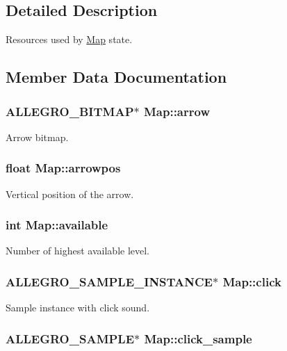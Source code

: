 \subsection{\-Detailed \-Description}
\-Resources used by \hyperlink{structMap}{\-Map} state. 

\subsection{\-Member \-Data \-Documentation}
\hypertarget{structMap_a607f79d7c594540ebf58f88fb999250d}{
\subsubsection[{arrow}]{\setlength{\rightskip}{0pt plus 5cm}\-A\-L\-L\-E\-G\-R\-O\-\_\-\-B\-I\-T\-M\-A\-P$\ast$ {\bf \-Map\-::arrow}}}\label{structMap_a607f79d7c594540ebf58f88fb999250d}
\-Arrow bitmap. \hypertarget{structMap_a4f395f7bdf7bc0782e29e996e87237bb}{
\subsubsection[{arrowpos}]{\setlength{\rightskip}{0pt plus 5cm}float {\bf \-Map\-::arrowpos}}}\label{structMap_a4f395f7bdf7bc0782e29e996e87237bb}
\-Vertical position of the arrow. \hypertarget{structMap_aa000e129cf19d6d6d9a78cfce0ef58fc}{
\subsubsection[{available}]{\setlength{\rightskip}{0pt plus 5cm}int {\bf \-Map\-::available}}}\label{structMap_aa000e129cf19d6d6d9a78cfce0ef58fc}
\-Number of highest available level. \hypertarget{structMap_a32370a5fb75fcf7d0bebd210cb2a0985}{
\subsubsection[{click}]{\setlength{\rightskip}{0pt plus 5cm}\-A\-L\-L\-E\-G\-R\-O\-\_\-\-S\-A\-M\-P\-L\-E\-\_\-\-I\-N\-S\-T\-A\-N\-C\-E$\ast$ {\bf \-Map\-::click}}}\label{structMap_a32370a5fb75fcf7d0bebd210cb2a0985}
\-Sample instance with click sound. \hypertarget{structMap_abcd15a027ece6075efe4baaf99c7595d}{
\subsubsection[{click\-\_\-sample}]{\setlength{\rightskip}{0pt plus 5cm}\-A\-L\-L\-E\-G\-R\-O\-\_\-\-S\-A\-M\-P\-L\-E$\ast$ {\bf \-Map\-::click\-\_\-sample}}}\label{structMap_abcd15a027ece6075efe4baaf99c7595d}
